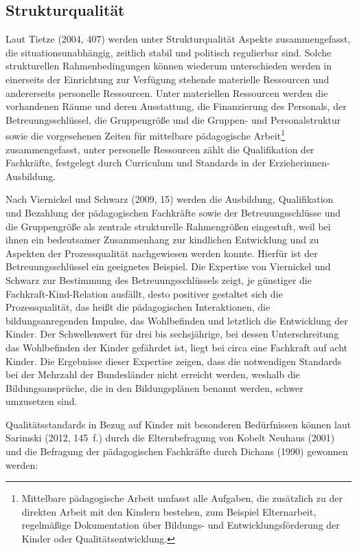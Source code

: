 \subsection{Strukturqualität}
\label{subsec:Strukturquali}
Laut Tietze (2004, 407) werden unter Strukturqualität Aspekte zusammengefasst, die situationsunabhängig, zeitlich stabil und politisch regulierbar sind. Solche strukturellen Rahmenbedingungen können wiederum unterschieden werden in einerseits der Einrichtung zur Verfügung stehende materielle Ressourcen und andererseits personelle Ressourcen. Unter materiellen Ressourcen werden die vorhandenen Räume und deren Ausstattung, die Finanzierung des Personals, der Betreuungsschlüssel, die Gruppengröße und die Gruppen- und Personalstruktur sowie die vorgesehenen Zeiten für mittelbare pädagogische Arbeit\footnote{ Mittelbare pädagogische Arbeit umfasst alle Aufgaben, die zusätzlich zu der direkten Arbeit mit den Kindern bestehen, zum Beispiel Elternarbeit, regelmäßige Dokumentation über Bildungs- und Entwicklungsförderung der Kinder oder Qualitätsentwicklung.} zusammengefasst, unter personelle Ressourcen zählt die Qualifikation der Fachkräfte, festgelegt durch Curriculum und Standards in der Erzieherinnen-Ausbildung. 

Nach Viernickel und Schwarz (2009, 15) werden die Ausbildung, Qualifikation und Bezahlung der pädagogischen Fachkräfte sowie der Betreuungsschlüsse und die Gruppengröße als zentrale strukturelle Rahmengrößen eingestuft, weil bei ihnen ein bedeutsamer Zusammenhang zur kindlichen Entwicklung und zu Aspekten der Prozessqualität nachgewiesen werden konnte. 
Hierfür ist der Betreuungsschlüssel ein geeignetes Beispiel. Die Expertise von Viernickel und Schwarz zur Bestimmung des Betreuungsschlüssels zeigt, je günstiger die Fachkraft-Kind-Relation ausfällt, desto positiver gestaltet sich die Prozessqualität, das heißt die pädagogischen Interaktionen, die bildungsanregenden Impulse, das Wohlbefinden und letztlich die Entwicklung der Kinder. Der Schwellenwert für drei bis sechsjährige, bei dessen Unterschreitung das Wohlbefinden der Kinder gefährdet ist, liegt bei circa eine Fachkraft auf acht Kinder. Die Ergebnisse dieser Expertise zeigen, dass die notwendigen Standards bei der Mehrzahl der Bundesländer nicht erreicht werden, weshalb die Bildungsansprüche, die in den Bildungsplänen benannt werden, schwer umzusetzen sind.

Qualitätsstandards in Bezug auf Kinder mit besonderen Bedürfnissen können laut Sarimski (2012, 145~f.) durch die Elternbefragung von Kobelt Neuhaus (2001) und die Befragung der pädagogischen Fachkräfte durch Dichans (1990) gewonnen werden:
 
